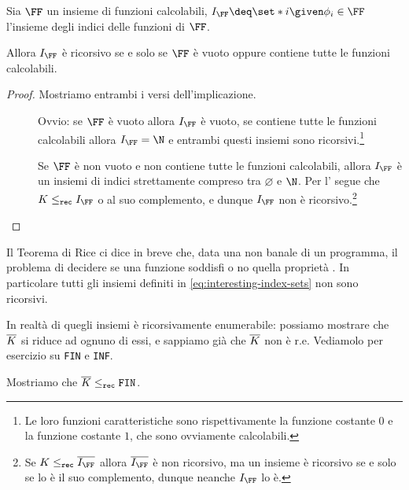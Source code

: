 \begin{theorem}
    Sia $\FF$ un insieme di funzioni calcolabili, $I_{\FF} \deq \set*{i \given \phi_i \in \FF}$ l'insieme degli indici delle funzioni di $\FF$.
    
    Allora $I_{\FF}$ è ricorsivo se e solo se $\FF$ è vuoto oppure contiene tutte le funzioni calcolabili. 
\end{theorem}
\begin{proof}
    Mostriamo entrambi i versi dell'implicazione.

    \begin{description}
        \item[\boximplby] Ovvio: se $\FF$ è vuoto allora $I_{\FF}$ è vuoto, se contiene tutte le funzioni calcolabili allora $I_{\FF} = \N$ e entrambi questi insiemi sono ricorsivi.\footnote{Le loro funzioni caratteristiche sono rispettivamente la funzione costante $0$ e la funzione costante $1$, che sono ovviamente calcolabili.}
        \item[\boximpl] Se $\FF$ è non vuoto e non contiene tutte le funzioni calcolabili, allora $I_{\FF}$ è un insiemi di indici strettamente compreso tra $\varnothing$ e $\N$. Per l' segue che $K \leq_{\rec} I_{\FF}$ o al suo complemento, e dunque $I_{\FF}$ non è ricorsivo.\footnote{Se $K \leq_{\rec} \compl{I_{\FF}}$ allora $\compl{I_{\FF}}$ è non ricorsivo, ma un insieme è ricorsivo se e solo se lo è il suo complemento, dunque neanche $I_{\FF}$ lo è.}  \qedhere 
    \end{description}
\end{proof}

Il Teorema di Rice ci dice in breve che, data una  non banale di un programma, il problema di decidere se una funzione soddisfi o no quella proprietà . In particolare tutti gli insiemi definiti in \eqref{eq:interesting-index-sets} non sono ricorsivi.

In realtà  di quegli insiemi è ricorsivamente enumerabile: possiamo mostrare che $\overline{K}$ si riduce ad ognuno di essi, e sappiamo già che $\overline{K}$ non è r.e. Vediamolo per esercizio su \texttt{FIN} e \texttt{INF}.

Mostriamo che $\overline{K} \leq_{\texttt{rec}} \texttt{FIN}$.

